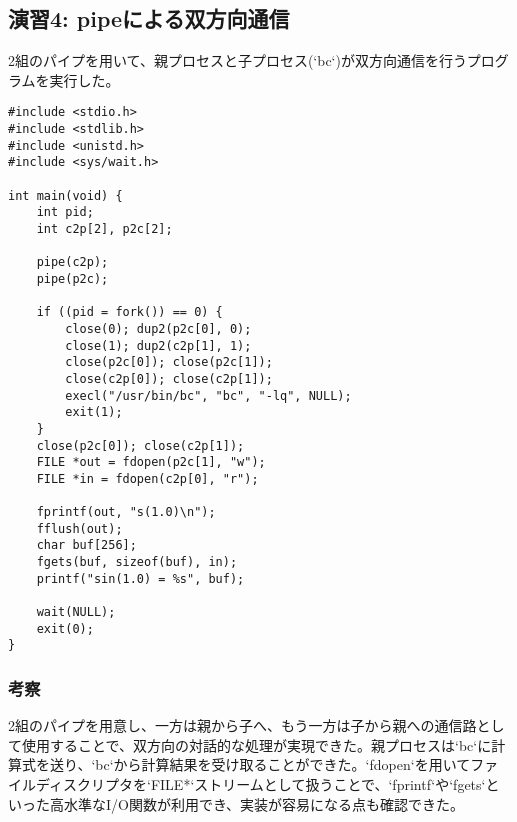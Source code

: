 \documentclass[a4paper,11pt,dvipdfmx]{jsarticle}
\begin{document}
\subsection{演習4: pipeによる双方向通信}
2組のパイプを用いて、親プロセスと子プロセス(`bc`)が双方向通信を行うプログラムを実行した。
\begin{lstlisting}[caption={pipe\_twoway.c}, label=lst:pipe_twoway]
#include <stdio.h>
#include <stdlib.h>
#include <unistd.h>
#include <sys/wait.h>

int main(void) {
    int pid;
    int c2p[2], p2c[2]; 

    pipe(c2p);
    pipe(p2c);

    if ((pid = fork()) == 0) { 
        close(0); dup2(p2c[0], 0);
        close(1); dup2(c2p[1], 1);
        close(p2c[0]); close(p2c[1]);
        close(c2p[0]); close(c2p[1]);
        execl("/usr/bin/bc", "bc", "-lq", NULL);
        exit(1);
    }
    close(p2c[0]); close(c2p[1]);
    FILE *out = fdopen(p2c[1], "w"); 
    FILE *in = fdopen(c2p[0], "r"); 

    fprintf(out, "s(1.0)\n");
    fflush(out);
    char buf[256];
    fgets(buf, sizeof(buf), in);
    printf("sin(1.0) = %s", buf);

    wait(NULL);
    exit(0);
}
\end{lstlisting}
\subsubsection{考察}
2組のパイプを用意し、一方は親から子へ、もう一方は子から親への通信路として使用することで、双方向の対話的な処理が実現できた。親プロセスは`bc`に計算式を送り、`bc`から計算結果を受け取ることができた。`fdopen`を用いてファイルディスクリプタを`FILE*`ストリームとして扱うことで、`fprintf`や`fgets`といった高水準なI/O関数が利用でき、実装が容易になる点も確認できた。
\end{document}
